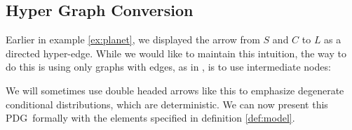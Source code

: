 \documentclass{article}
\newcommand{\MN}{PDG}
\numberwithin{equation}{section}
\begin{document}
	\subsection{Hyper Graph Conversion}\label{sec:hyper-convert}
	\begin{example}[continues=ex:planet]
		Earlier in example \ref{ex:planet}, we displayed the arrow from $S$ and $C$ to $L$ as a directed hyper-edge. While we would like to maintain this intuition, the way to do this is using only graphs with edges, as in , is to use intermediate nodes:
		
		\begin{center}
		\end{center}
		We will sometimes use double headed arrows like this to emphasize degenerate conditional distributions, which are deterministic.
		We can now present this \MN\ formally with the elements specified in definition \ref{def:model}.
		

\end{example}
\end{document}
